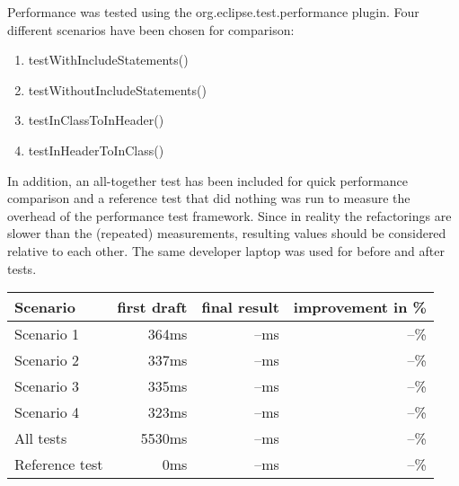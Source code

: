 Performance was tested using the org.eclipse.test.performance plugin. Four
different scenarios have been chosen for comparison:

\begin{enumerate}
\item testWithIncludeStatements()
\item testWithoutIncludeStatements()
\item testInClassToInHeader()
\item testInHeaderToInClass()
\end{enumerate}

In addition, an all-together test has been included for quick performance
comparison and a reference test that did nothing was run to measure the overhead
of the performance test framework. Since in reality the refactorings are slower
than the (repeated) measurements, resulting values should be considered relative
to each other. The same developer laptop was used for before and after tests.

\begin{tabular}[t]{l|rrr}
 Scenario   & first draft & final result & improvement in \% \\
 \hline
 Scenario 1	&  364ms & --ms & --\% \\
 Scenario 2	&  337ms & --ms & --\% \\
 Scenario 3	&  335ms & --ms & --\% \\
 Scenario 4	&  323ms & --ms & --\% \\
 All tests	& 5530ms & --ms & --\% \\
 Reference test	&    0ms & --ms & --\% \\
\end{tabular}

